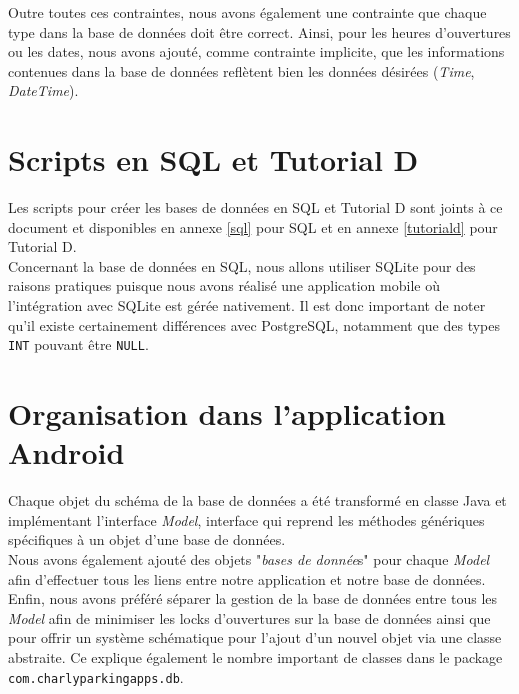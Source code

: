 \documentclass[a4paper,11pt]{article}
\begin{document}
Outre toutes ces contraintes, nous avons également une contrainte que chaque type dans la base de données doit être correct.  Ainsi, pour les heures d'ouvertures ou les dates, nous avons ajouté, comme contrainte implicite, que les informations contenues dans la base de données reflètent bien les données désirées (\textit{Time}, \textit{DateTime}).

\section{Scripts en SQL et Tutorial D}
Les scripts pour créer les bases de données en SQL et Tutorial D sont joints à ce document et disponibles en annexe \vref{sql} pour SQL et en annexe \vref{tutoriald} pour Tutorial D.\\
Concernant la base de données en SQL, nous allons utiliser SQLite pour des raisons pratiques puisque nous avons réalisé une application mobile où l'intégration avec SQLite est gérée nativement. Il est donc important de noter qu'il existe certainement différences avec PostgreSQL, notamment que des types \texttt{INT} pouvant être \texttt{NULL}.

\section{Organisation dans l'application Android}
Chaque objet du schéma de la base de données a été transformé en classe Java et implémentant l'interface \emph{Model}, interface qui reprend les méthodes génériques spécifiques à un objet d'une base de données.\\
Nous avons également ajouté des objets "\textit{bases de donnée}s" pour chaque \emph{Model} afin d'effectuer tous les liens entre notre application et notre base de données. Enfin, nous avons préféré séparer la gestion de la base de données entre tous les \emph{Model} afin de minimiser les locks d'ouvertures sur la base de données ainsi que pour offrir un système schématique pour l'ajout d'un nouvel objet via une classe abstraite. Ce explique également le nombre important de classes dans le package \texttt{com.charlyparkingapps.db}.
\end{document}

